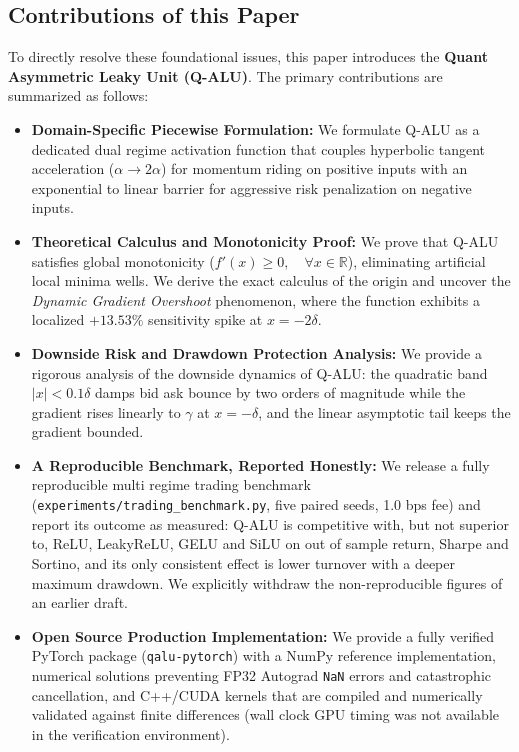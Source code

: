 \documentclass[conference]{IEEEtran}
\begin{document}
\subsection{Contributions of this Paper}
To directly resolve these foundational issues, this paper introduces the \textbf{Quant Asymmetric Leaky Unit (Q-ALU)}. The primary contributions are summarized as follows:
\begin{itemize}
    \item \textbf{Domain-Specific Piecewise Formulation:} We formulate Q-ALU as a dedicated dual regime activation function that couples hyperbolic tangent acceleration ($\alpha \to 2\alpha$) for momentum riding on positive inputs with an exponential to linear barrier for aggressive risk penalization on negative inputs.
    \item \textbf{Theoretical Calculus and Monotonicity Proof:} We prove that Q-ALU satisfies global monotonicity ($f'(x) \ge 0, \quad \forall x \in \mathbb{R}$), eliminating artificial local minima wells. We derive the exact calculus of the origin and uncover the \textit{Dynamic Gradient Overshoot} phenomenon, where the function exhibits a localized $+13.53\%$ sensitivity spike at $x = -2\delta$.
    \item \textbf{Downside Risk and Drawdown Protection Analysis:} We provide a rigorous analysis of the downside dynamics of Q-ALU: the quadratic band $|x| < 0.1\delta$ damps bid ask bounce by two orders of magnitude while the gradient rises linearly to $\gamma$ at $x = -\delta$, and the linear asymptotic tail keeps the gradient bounded.
    \item \textbf{A Reproducible Benchmark, Reported Honestly:} We release a fully reproducible multi regime trading benchmark (\texttt{experiments/trading\_benchmark.py}, five paired seeds, 1.0 bps fee) and report its outcome as measured: Q-ALU is competitive with, but not superior to, ReLU, LeakyReLU, GELU and SiLU on out of sample return, Sharpe and Sortino, and its only consistent effect is lower turnover with a deeper maximum drawdown. We explicitly withdraw the non-reproducible figures of an earlier draft.
    \item \textbf{Open Source Production Implementation:} We provide a fully verified PyTorch package (\texttt{qalu-pytorch}) with a NumPy reference implementation, numerical solutions preventing FP32 Autograd \texttt{NaN} errors and catastrophic cancellation, and C++/CUDA kernels that are compiled and numerically validated against finite differences (wall clock GPU timing was not available in the verification environment).
\end{itemize}
\end{document}
